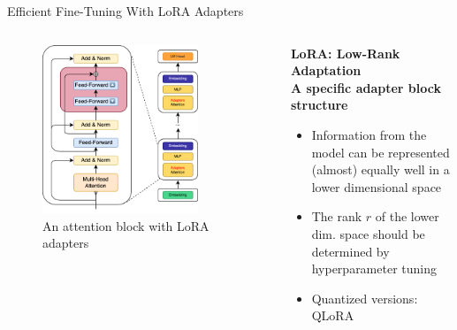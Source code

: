 \documentclass[11pt,aspectratio=169]{beamer}
\begin{document}
\begin{frame}{Efficient Fine-Tuning With LoRA Adapters~\cite{hu2021loralowrankadaptationlarge}}
    \begin{columns}
        \begin{column}{0.5\linewidth}
            \vspace{-0.2cm}
            \begin{figure}
                \centering
                \includegraphics[width=0.8\textwidth]{llama-adapter.png}
                \caption{\centering An attention block with LoRA adapters}
            \end{figure}
        \end{column}
        \begin{column}{0.5\linewidth}
            \vspace{-0.5cm}
            \begin{center}
            \textbf{LoRA: Low-Rank Adaptation\\A specific adapter block structure}
            \end{center}
            \vspace{0.1cm}
            \begin{itemize}
                \item Information from the model can be represented (almost) equally well in a lower dimensional space
                \item The rank $r$ of the lower dim. space should be determined by hyperparameter tuning
                \item Quantized versions: QLoRA~\cite{dettmers2023qloraefficientfinetuningquantized}
            \end{itemize}
        \end{column}
    \end{columns}    
\end{frame}
\end{document}
